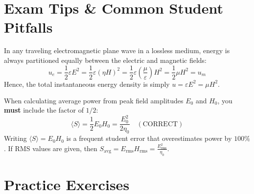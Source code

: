 \section{Exam Tips \& Common Student Pitfalls}

\begin{examtip}
In any traveling electromagnetic plane wave in a lossless medium, energy is always partitioned equally between the electric and magnetic fields:
\begin{equation*}
    u_e = \frac{1}{2}\varepsilon E^2 = \frac{1}{2}\varepsilon (\eta H)^2 = \frac{1}{2}\varepsilon \left(\frac{\mu}{\varepsilon}\right) H^2 = \frac{1}{2}\mu H^2 = u_m
\end{equation*}
Hence, the total instantaneous energy density is simply $u = \varepsilon E^2 = \mu H^2$.
\end{examtip}

\begin{commonmistake}
When calculating average power from peak field amplitudes $E_0$ and $H_0$, you \textbf{must} include the factor of $1/2$:
\begin{equation*}
    \langle S \rangle = \frac{1}{2} E_0 H_0 = \frac{E_0^2}{2\eta_0} \quad (\text{CORRECT})
\end{equation*}
Writing $\langle S \rangle = E_0 H_0$ is a frequent student error that overestimates power by $100\%$. If RMS values are given, then $S_{\text{avg}} = E_{\text{rms}} H_{\text{rms}} = \frac{E_{\text{rms}}^2}{\eta_0}$.
\end{commonmistake}

\section{Practice Exercises}

